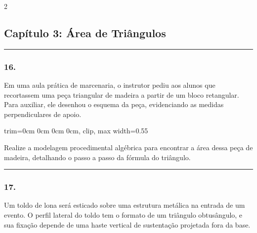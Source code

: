 \documentclass[twoside, 10pt, a4paper]{article}
\newlength{\espacoPosTitulo}\setlength{\espacoPosTitulo}{0.3cm}
\newlength{\espacoPreQuestao}\setlength{\espacoPreQuestao}{0.1cm}
\newlength{\espacoQuestao}\setlength{\espacoQuestao}{0.2cm}
\begin{document}
\begin{multicols*}{2}
\subsection*{Capítulo 3: Área de Triângulos}
\vspace{-0.2cm}\noindent\rule{\linewidth}{1.5pt} 
\par\vspace{\espacoPosTitulo}
\subsubsection*{16.} Em uma aula prática de marcenaria, o instrutor pediu aos alunos que recortassem uma peça triangular de madeira a partir de um bloco retangular. Para auxiliar, ele desenhou o esquema da peça, evidenciando as medidas perpendiculares de apoio.

\begin{center}
\begin{adjustbox}{trim=0cm 0cm 0cm 0cm, clip, max width=0.55\linewidth}
\end{adjustbox}
\end{center}

Realize a modelagem procedimental algébrica para encontrar a área dessa peça de madeira, detalhando o passo a passo da fórmula do triângulo.
\par\vspace{\espacoQuestao}

\noindent\textcolor{CorLinha}{\rule{\linewidth}{0.5pt}} 
\par\vspace{\espacoPreQuestao}
\subsubsection*{17.} Um toldo de lona será esticado sobre uma estrutura metálica na entrada de um evento. O perfil lateral do toldo tem o formato de um triângulo obtusângulo, e sua fixação depende de uma haste vertical de sustentação projetada fora da base. 


\end{multicols*}
\end{document}
